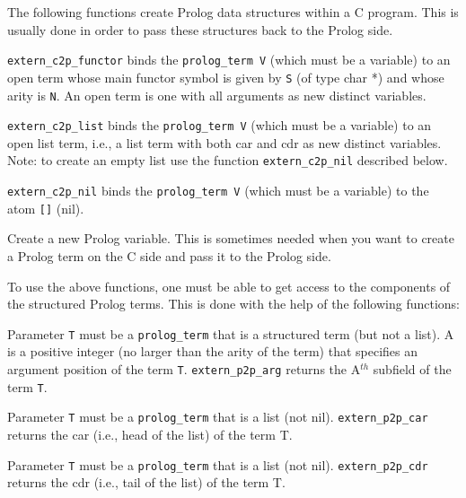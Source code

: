 The following functions create Prolog data structures within a C
program. This is usually done in order to pass these structures back to
the Prolog side.
\begin{description}
%
{\tt extern\_c2p\_functor} binds the {\tt prolog\_term V} (which must
be a variable) to an open term whose main functor symbol is given by
{\tt S} (of type char *) and whose arity is {\tt N}.  An open term is
one with all arguments as new distinct variables.

%
{\tt extern\_c2p\_list} binds the {\tt prolog\_term V} (which must be
a variable) to an open list term, i.e., a list term with both car and
cdr as new distinct variables. Note: to create an empty list use the
function {\tt extern\_c2p\_nil} described below.

%
{\tt extern\_c2p\_nil} binds the {\tt prolog\_term V} (which must be a
variable) to the atom \verb|[]| (nil).

%
Create a new Prolog variable. This is sometimes needed when you want
to create a Prolog term on the C side and pass it to the Prolog side.
\end{description}

To use the above functions, one must be able to get access to the
components of the structured Prolog terms.  This is done with the help
of the following functions:

\begin{description}
%
Parameter {\tt T} must be a {\tt prolog\_term} that is a structured
term (but not a list).  A is a positive integer (no larger than the
arity of the term) that specifies an argument position of the term
{\tt T}.  {\tt extern\_p2p\_arg} returns the A$^{th}$ subfield of the
term {\tt T}.

%
Parameter {\tt T} must be a {\tt prolog\_term} that is a list (not
nil).  {\tt extern\_p2p\_car} returns the car (i.e., head of the list)
of the term T.

%
Parameter {\tt T} must be a {\tt prolog\_term} that is a list (not
nil).  {\tt extern\_p2p\_cdr} returns the cdr (i.e., tail of the list)
of the term T.
\end{description}

